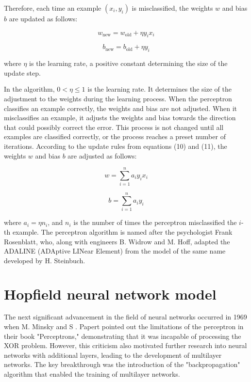 \documentclass[12pt,a4paper]{report}
\begin{document}
Therefore, each time an example \( (x_i, y_i) \) is misclassified, the weights \( w \) and bias \( b \) are updated as follows:

\begin{equation}
w_{\text{new}} = w_{\text{old}} + \eta y_i x_i
\end{equation}

\begin{equation}
b_{\text{new}} = b_{\text{old}} + \eta y_i
\end{equation}

where \( \eta \) is the learning rate, a positive constant determining the size of the update step.


In the algorithm, \( 0 < \eta \leq 1 \) is the learning rate. It determines the size of the adjustment to the weights during the learning process. When the perceptron classifies an example correctly, the weights and bias are not adjusted. When it misclassifies an example, it adjusts the weights and bias towards the direction that could possibly correct the error. This process is not changed until all examples are classified correctly, or the process reaches a preset number of iterations. According to the update rules from equations (10) and (11), the weights \( w \) and bias \( b \) are adjusted as follows:

\begin{equation}
w = \sum_{i=1}^{n} a_i y_i x_i
\end{equation}

\begin{equation}
b = \sum_{i=1}^{n} a_i y_i
\end{equation}

where \( a_i = \eta n_i \), and \( n_i \) is the number of times the perceptron misclassified the \( i \)-th example. The perceptron algorithm is named after the psychologist Frank Rosenblatt, who, along with engineers B. Widrow and M. Hoff, adapted the ADALINE (ADAptive LINear Element) from the model of the same name developed by H. Steinbuch.


\section{Hopfield neural network model}
The next significant advancement in the field of neural networks occurred in 1969 when M. Minsky and S \cite{JJHopfield1982NeuralNetworksPhysical}. Papert pointed out the limitations of the perceptron in their book "Perceptrons," demonstrating that it was incapable of processing the XOR problem. However, this criticism also motivated further research into neural networks with additional layers, leading to the development of multilayer networks. The key breakthrough was the introduction of the "backpropagation" algorithm that enabled the training of multilayer networks.
\end{document}
